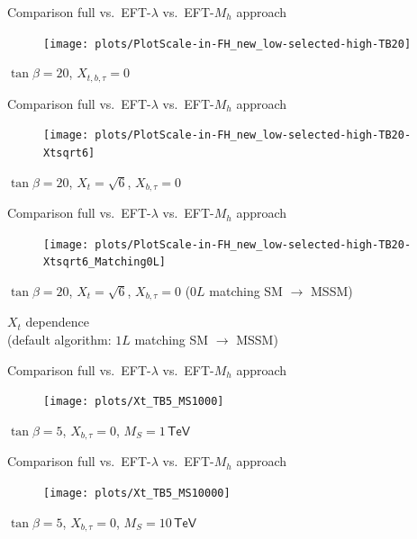 \documentclass[hyperref={pdfpagelabels=false},ngerman]{beamer}
\newcommand{\eh}[1]{\,\mathsf{#1}}
\begin{document}
\begin{frame}[noframenumbering]{Comparison full vs.\ EFT-$\lambda$ vs.\ EFT-$M_h$ approach}
  \begin{figure}
    \centering
    \texttt{[image: plots/PlotScale-in-FH\_new\_low-selected-high-TB20]}
  \end{figure}
  $\tan\beta = 20$, $X_{t,b,\tau} = 0$
\end{frame}

\begin{frame}[noframenumbering]{Comparison full vs.\ EFT-$\lambda$ vs.\ EFT-$M_h$ approach}
  \begin{figure}
    \centering
    \texttt{[image: plots/PlotScale-in-FH\_new\_low-selected-high-TB20-Xtsqrt6]}
  \end{figure}
  $\tan\beta = 20$, $X_{t} = \sqrt{6}$, $X_{b,\tau} = 0$
\end{frame}

\begin{frame}[noframenumbering]{Comparison full vs.\ EFT-$\lambda$ vs.\ EFT-$M_h$ approach}
  \begin{figure}
    \centering
    \texttt{[image: plots/PlotScale-in-FH\_new\_low-selected-high-TB20-Xtsqrt6\_Matching0L]}
  \end{figure}
  $\tan\beta = 20$, $X_{t} = \sqrt{6}$, $X_{b,\tau} = 0$ ($0L$ matching SM $\rightarrow$ MSSM)
\end{frame}


\begin{frame}[noframenumbering]
  \begin{center}
    {\Large $X_t$ dependence}\\[1em]
    (default algorithm: $1L$ matching SM $\rightarrow$ MSSM)
  \end{center}
\end{frame}

\begin{frame}[noframenumbering]{Comparison full vs.\ EFT-$\lambda$ vs.\ EFT-$M_h$ approach}
  \begin{figure}
    \centering
    \texttt{[image: plots/Xt\_TB5\_MS1000]}
  \end{figure}
  $\tan\beta = 5$, $X_{b,\tau} = 0$, $M_S = 1\eh{TeV}$
\end{frame}

\begin{frame}[noframenumbering]{Comparison full vs.\ EFT-$\lambda$ vs.\ EFT-$M_h$ approach}
  \begin{figure}
    \centering
    \texttt{[image: plots/Xt\_TB5\_MS10000]}
  \end{figure}
  $\tan\beta = 5$, $X_{b,\tau} = 0$, $M_S = 10\eh{TeV}$
\end{frame}
\end{document}
